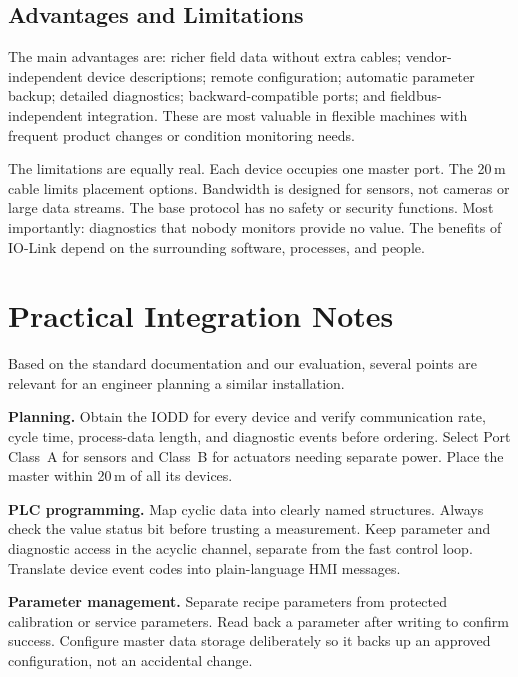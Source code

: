 \documentclass[conference]{IEEEtran}
\begin{document}
\subsection{Advantages and Limitations}

The main advantages are: richer field data without extra cables;
vendor-independent device descriptions; remote configuration; automatic
parameter backup; detailed diagnostics; backward-compatible ports; and
fieldbus-independent integration. These are most valuable in flexible
machines with frequent product changes or condition monitoring needs.

The limitations are equally real. Each device occupies one master port.
The 20\,m cable limits placement options. Bandwidth is designed for
sensors, not cameras or large data streams. The base protocol has no
safety or security functions. Most importantly: diagnostics that nobody
monitors provide no value. The benefits of IO-Link depend on the
surrounding software, processes, and people.

\section{Practical Integration Notes}
\label{sec:integration}

Based on the standard documentation and our evaluation, several points
are relevant for an engineer planning a similar installation.

\textbf{Planning.}
Obtain the IODD for every device and verify communication rate, cycle
time, process-data length, and diagnostic events before ordering.
Select Port Class~A for sensors and Class~B for actuators needing
separate power. Place the master within 20\,m of all its devices.

\textbf{PLC programming.}
Map cyclic data into clearly named structures. Always check the value
status bit before trusting a measurement. Keep parameter and diagnostic
access in the acyclic channel, separate from the fast control loop.
Translate device event codes into plain-language HMI messages.

\textbf{Parameter management.}
Separate recipe parameters from protected calibration or service
parameters. Read back a parameter after writing to confirm success.
Configure master data storage deliberately so it backs up an approved
configuration, not an accidental change.
\end{document}
